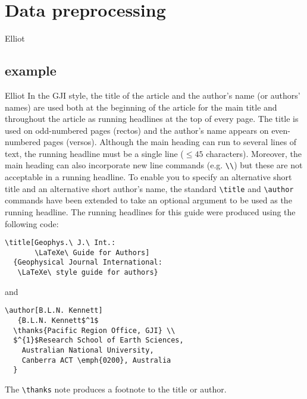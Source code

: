 \documentclass{gji}
\let\leqslant=\leq
\begin{document}
\section{Data preprocessing}

Elliot

\subsection{example}
Elliot \newline \newline
In the GJI style, the title of the article and the author's name (or
authors' names) are used both at the beginning of the article for the
main title and throughout the article as running headlines at the top
of every page. The title is used on odd-numbered pages (rectos) and the
author's name appears on even-numbered pages (versos). Although the
main heading can run to several lines of text, the running headline
must be a single line ($\leqslant 45$ characters). Moreover, the main
heading can also incorporate new line commands (e.g. \verb"\\") but
these are not acceptable in a running headline. To enable you to
specify an alternative short title and an alternative short author's
name, the standard \verb"\title" and \verb"\author" commands have been
extended to take an optional argument to be used as the running
headline. The running headlines for this guide were produced using the
following code:
\begin{verbatim}
\title[Geophys.\ J.\ Int.:
       \LaTeXe\ Guide for Authors]
  {Geophysical Journal International:
   \LaTeXe\ style guide for authors}
\end{verbatim}
and
\begin{verbatim}
\author[B.L.N. Kennett]
   {B.L.N. Kennett$^1$
  \thanks{Pacific Region Office, GJI} \\
  $^{1}$Research School of Earth Sciences,
    Australian National University,
    Canberra ACT \emph{0200}, Australia
  }
\end{verbatim}
The \verb"\thanks" note produces a footnote to the title or author.
\end{document}
